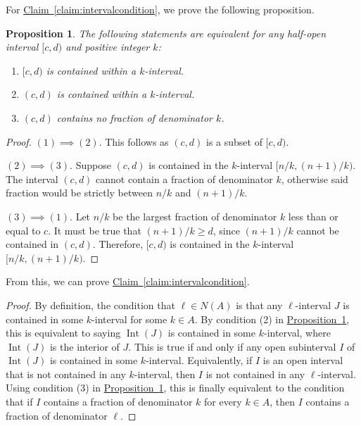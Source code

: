 \documentclass[11pt]{article}
\numberwithin{equation}{section}
\newtheorem{proposition}[theorem]{Proposition}
\theoremstyle{definition}
\theoremstyle{plain}
\newcommand{\expref}[2]{\hyperref[#2]{#1~\ref{#2}}}
\newcommand{\A}{A}
\DeclareMathOperator{\Int}{Int}
\begin{document}
For \expref{Claim}{claim:intervalcondition},  we prove the following proposition.
\begin{proposition}
    \label{prop:intervalcondition-1}
    The following statements are equivalent for any half-open interval $[c,d)$ and positive integer $k$:
    \begin{enumerate}[(1)]
        \item $[c,d)$ is contained within a $k$-interval.
        \item $(c,d)$ is contained within a $k$-interval.
        \item $(c,d)$ contains no fraction of denominator $k$.
    \end{enumerate}
\end{proposition}

\begin{proof} $(1) \implies (2)$. This follows as $(c,d)$ is a subset of $[c,d)$.
        
        $(2) \implies (3)$. Suppose $(c,d)$ is contained in the $k$-interval $[n/k, (n+1)/k)$. The interval $(c,d)$ cannot contain a fraction of denominator $k$, otherwise said fraction would be strictly between $n/k$ and $(n+1)/k$.
        
        $(3) \implies (1)$. Let $n/k$ be the largest fraction of denominator $k$ less than or equal to $c$. It must be true that $(n+1)/k\ge d$, since $(n+1)/k$ cannot be contained in $(c,d)$. Therefore, $[c,d)$ is contained in the $k$-interval $[n/k, (n+1)/k)$.
\end{proof}

From this, we can prove \expref{Claim}{claim:intervalcondition}. 

\begin{proof}
    By definition, the condition that $\ell\in N(A)$ is that any $\ell$-interval $J$ is contained in some $k$-interval for some $k\in A$. By condition (2) in \expref{Proposition}{prop:intervalcondition-1}, this is equivalent to saying $\Int(J)$ is contained in some $k$-interval, where $\Int(J)$ is the interior of $J$. This is true if and only if any open subinterval $I$ of $\Int(J)$ is contained in some $k$-interval. Equivalently, if $I$ is an open interval that is not contained in any $k$-interval, then $I$ is not contained in any $\ell$-interval. Using condition (3) in \expref{Proposition}{prop:intervalcondition-1}, this is finally equivalent to the condition that if $I$ contains a fraction of denominator $k$ for every $k\in \A$, then $I$ contains a fraction of denominator $\ell$.
\end{proof}
\end{document}
